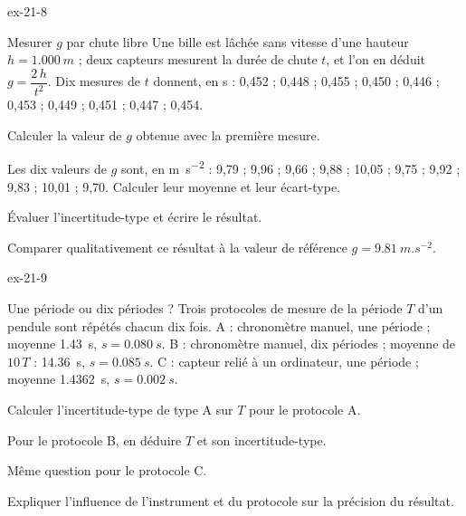 \begin{blocLivre}{ex-21-8}
\begin{exercice}[2]{Mesurer $g$ par chute libre}
Une bille est lâchée sans vitesse d'une hauteur $h=\qty{1,000}{m}$ ; deux capteurs mesurent la durée de chute $t$, et l'on en déduit
$g=\dfrac{2\,h}{t^2}$. Dix mesures de $t$ donnent, en s : 0,452 ; 0,448 ; 0,455 ; 0,450 ; 0,446 ; 0,453 ; 0,449 ; 0,451 ; 0,447 ; 0,454.
\begin{questions}
\item Calculer la valeur de $g$ obtenue avec la première mesure.
\item Les dix valeurs de $g$ sont, en \unit{m.s^{-2}} : 9,79 ; 9,96 ; 9,66 ; 9,88 ; 10,05 ; 9,75 ; 9,92 ; 9,83 ; 10,01 ; 9,70. Calculer leur moyenne et leur écart-type.
\item Évaluer l'incertitude-type et écrire le résultat.
\item Comparer qualitativement ce résultat à la valeur de référence $g=\qty{9,81}{m.s^{-2}}$.
\end{questions}
\end{exercice}
\end{blocLivre}
\begin{blocLivre}{ex-21-9}
\begin{exercice}[2]{Une période ou dix périodes ?}
Trois protocoles de mesure de la période $T$ d'un pendule sont répétés chacun dix fois. A : chronomètre manuel, une période ;
moyenne \qty{1,43}{s}, $s=\qty{0,080}{s}$. B : chronomètre manuel, dix périodes ; moyenne de $10\,T$ : \qty{14,36}{s}, $s=\qty{0,085}{s}$. C : capteur relié à un
ordinateur, une période ; moyenne \qty{1,4362}{s}, $s=\qty{0,002}{s}$.
\begin{questions}
\item Calculer l'incertitude-type de type A sur $T$ pour le protocole A.
\item Pour le protocole B, en déduire $T$ et son incertitude-type.
\item Même question pour le protocole C.
\item Expliquer l'influence de l'instrument et du protocole sur la précision du résultat.
\end{questions}
\end{exercice}
\end{blocLivre}

